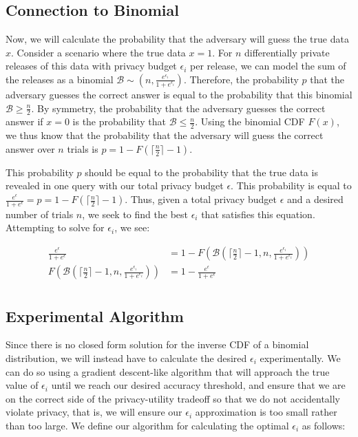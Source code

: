\documentclass[12pt]{article}
\theoremstyle{definition}
\begin{document}
\subsection{Connection to Binomial}

\noindent

Now, we will calculate the probability that the adversary will guess the true data $x$. Consider a scenario where the true data $x = 1$. For $n$ differentially private releases of this data with privacy budget $\epsilon_i$ per release, we can model the sum of the releases as a binomial $\mathcal{B} \sim (n, \frac{e^{\epsilon_i}}{1 + e^{\epsilon_i}})$. Therefore, the probability $p$ that the adversary guesses the correct answer is equal to the probability that this binomial $\mathcal{B} \geq \frac{n}{2}$. By symmetry, the probability that the adversary guesses the correct answer if $x = 0$ is the probability that $\mathcal{B} \leq \frac{n}{2}$. Using the binomial CDF $F(x)$, we thus know that the probability that the adversary will guess the correct answer over $n$ trials is $p = 1 - F(\lceil \frac{n}{2} \rceil - 1)$.

\bigskip

This probability $p$ should be equal to the probability that the true data is revealed in one query with our total privacy budget $\epsilon$. This probability is equal to $\frac{e^\epsilon}{1 + e^\epsilon} = p = 1 - F(\lceil \frac{n}{2} \rceil - 1)$. Thus, given a total privacy budget $\epsilon$ and a desired number of trials $n$, we seek to find the best $\epsilon_i$ that satisfies this equation. Attempting to solve for $\epsilon_i$, we see:

\begin{align*}
    \frac{e^\epsilon}{1 + e^\epsilon} &= 1 - F(\mathcal{B}(\lceil \frac{n}{2} \rceil - 1, n, \frac{e^{\epsilon_i}}{1 + e^{\epsilon_i}})) \\
    F(\mathcal{B}(\lceil \frac{n}{2} \rceil - 1, n, \frac{e^{\epsilon_i}}{1 + e^{\epsilon_i}})) &= 1 - \frac{e^\epsilon}{1 + e^\epsilon} \\
\end{align*}

\subsection{Experimental Algorithm}

\noindent

Since there is no closed form solution for the inverse CDF of a binomial distribution, we will instead have to calculate the desired $\epsilon_i$ experimentally. We can do so using a gradient descent-like algorithm that will approach the true value of $\epsilon_i$ until we reach our desired accuracy threshold, and ensure that we are on the correct side of the privacy-utility tradeoff so that we do not accidentally violate privacy, that is, we will ensure our $\epsilon_i$ approximation is too small rather than too large. We define our algorithm for calculating the optimal $\epsilon_i$ as follows:
\end{document}
